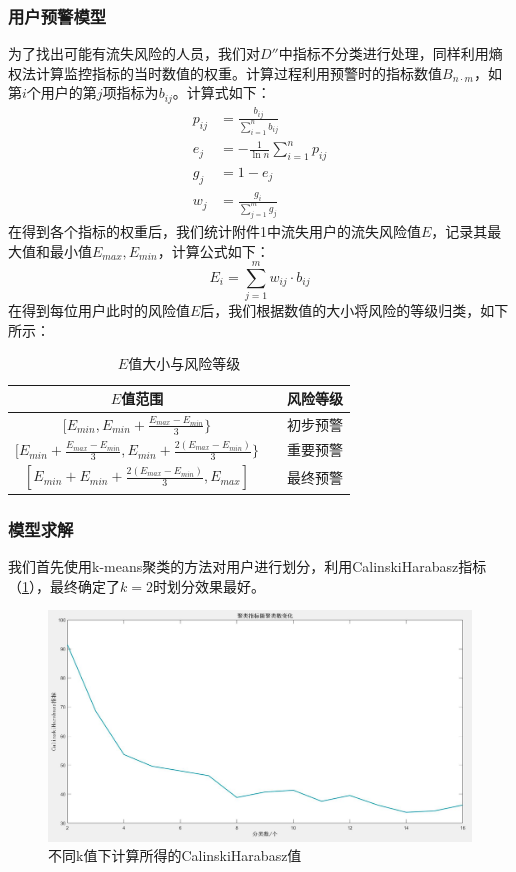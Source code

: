 \documentclass{my_paper}
\begin{document}
\subsubsection{用户预警模型}
为了找出可能有流失风险的人员，我们对$D''$中指标不分类进行处理，同样利用熵权法计算监控指标的当时数值的权重。计算过程利用预警时的指标数值$B_{n\cdot m}$，如第$i$个用户的第$j$项指标为$b_{ij}$。计算式如下：
\begin{align}
    p_{ij} &= \frac{b_{ij}}{\sum^n_{i=1}b_{ij}}\\
    e_j &= -\frac{1}{\ln n}\sum^n_{i=1}p_{ij}\\
    g_j &= 1-e_j\\
    w_j &= \frac{g_i}{\sum^m_{j=1}g_j}
    \label{d}
\end{align}
在得到各个指标的权重后，我们统计附件1中流失用户的流失风险值$E$，记录其最大值和最小值$E_{max},E_{min}$，计算公式如下：
\begin{equation}
    E_i = \sum^m_{j=1} w_{ij}\cdot b_{ij}
\end{equation}
在得到每位用户此时的风险值$E$后，我们根据数值的大小将风险的等级归类，如下所示：
\begin{table}[htb]
\centering
\caption{$E$值大小与风险等级}
\begin{tabular}{ccc}
\toprule
\multicolumn{1}{c}{$E$值范围}
  &&\multicolumn{1}{c}{风险等级}  \\ \midrule
$[ E_{min},E_{min}+\frac{E_{max}-E_{min}}{3}\}$            &&初步预警 \\
$[ E_{min}+\frac{E_{max}-E_{min}}{3},E_{min}+\frac{2(E_{max}-E_{min})}{3}\}$            &&重要预警 \\
$[ E_{min}+E_{min}+\frac{2(E_{max}-E_{min})}{3},E_{max}]$            &&最终预警 \\
\bottomrule
  \end{tabular}
\label{label}
  \end{table}
\subsubsection{模型求解}

我们首先使用k-means聚类的方法对用户进行划分，利用CalinskiHarabasz指标（\ref{zhibiao2}），最终确定了$k=2$时划分效果最好。
\begin {figure}[h]
\centering %
\includegraphics[width=\textwidth]{zhibiao2.jpg}
\caption{不同k值下计算所得的CalinskiHarabasz值} %
\label{zhibiao2}
\end {figure}
\end{document}
